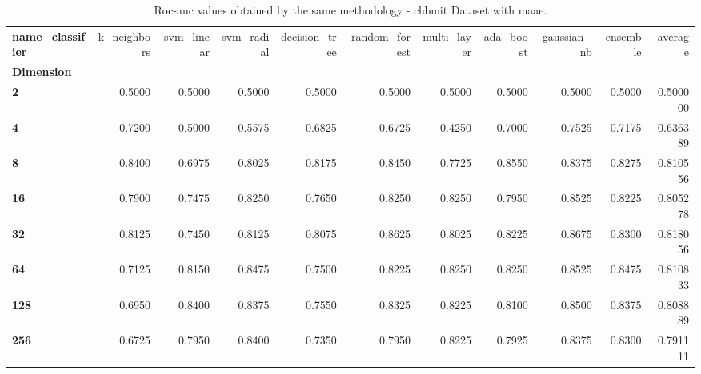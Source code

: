 \begin{table}
\centering
\caption{Roc-auc values obtained by the same methodology - chbmit Dataset with maae.}
\label{roc-auc_chbmit_maae-reproduction}
\begin{tabular}{lrrrrrrrrrr}
\toprule
\textbf{name\_classifier} &  k\_neighbors &  svm\_linear &  svm\_radial &  decision\_tree &  random\_forest &  multi\_layer &  ada\_boost &  gaussian\_nb &  ensemble &   average \\
\textbf{Dimension} &              &             &             &                &                &              &            &              &           &           \\
\midrule
\textbf{2        } &       0.5000 &      0.5000 &      0.5000 &         0.5000 &         0.5000 &       0.5000 &     0.5000 &       0.5000 &    0.5000 &  0.500000 \\
\textbf{4        } &       0.7200 &      0.5000 &      0.5575 &         0.6825 &         0.6725 &       0.4250 &     0.7000 &       0.7525 &    0.7175 &  0.636389 \\
\textbf{8        } &       0.8400 &      0.6975 &      0.8025 &         0.8175 &         0.8450 &       0.7725 &     0.8550 &       0.8375 &    0.8275 &  0.810556 \\
\textbf{16       } &       0.7900 &      0.7475 &      0.8250 &         0.7650 &         0.8250 &       0.8250 &     0.7950 &       0.8525 &    0.8225 &  0.805278 \\
\textbf{32       } &       0.8125 &      0.7450 &      0.8125 &         0.8075 &         0.8625 &       0.8025 &     0.8225 &       0.8675 &    0.8300 &  0.818056 \\
\textbf{64       } &       0.7125 &      0.8150 &      0.8475 &         0.7500 &         0.8225 &       0.8250 &     0.8250 &       0.8525 &    0.8475 &  0.810833 \\
\textbf{128      } &       0.6950 &      0.8400 &      0.8375 &         0.7550 &         0.8325 &       0.8225 &     0.8100 &       0.8500 &    0.8375 &  0.808889 \\
\textbf{256      } &       0.6725 &      0.7950 &      0.8400 &         0.7350 &         0.7950 &       0.8225 &     0.7925 &       0.8375 &    0.8300 &  0.791111 \\
\bottomrule
\end{tabular}
\end{table}
